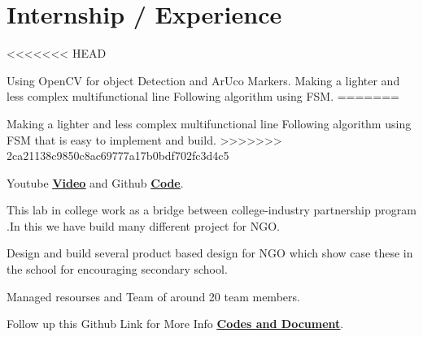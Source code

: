\documentclass[]{font}
\begin{document}
\begin{minipage}[t]{0.64\textwidth} 


\section{Internship / Experience}

\vspace{\topsep} %
\begin{tightemize}
<<<<<<< HEAD
\item Using OpenCV for object Detection and ArUco Markers. Making a lighter and less complex multifunctional line Following algorithm using FSM.
=======
\item Making a lighter and less complex multifunctional line Following algorithm
using​ ​ FSM​ that is easy to implement and build.
>>>>>>> 2ca21138c9850c8ac69777a17b0bdf702fc3d4c5
\item Youtube \textbf{\href{https://youtu.be/FhUvQlrLWxc}{\underline{Video}}} and Github \textbf{\href{https://github.com/pranav083/FSM_code}{\underline{Code}}}. 
\end{tightemize}
\sectionsep

\begin{tightemize}
\item This lab in college work as a bridge between college-industry partnership program .In this we have build many different project for NGO.
\item Design and build several product based design for NGO which show
case these in the school for encouraging secondary school.
\item Managed resourses and Team of around 20 team members. 
\item Follow up this Github Link for More Info \textbf{\href{https://github.com/pranav083/Tinkering_project}{\underline{Codes and Document}}}.	
\end{tightemize}
\sectionsep


\end{minipage}
\end{document}

